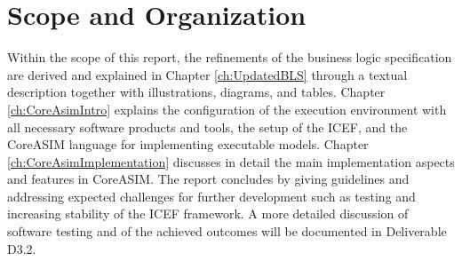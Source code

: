 \section{Scope and Organization}
Within the scope of this report, the refinements of the business logic specification are derived and explained in Chapter \ref{ch:UpdatedBLS} through a textual description together with illustrations, diagrams, and tables. Chapter \ref{ch:CoreAsimIntro} explains the configuration of the execution environment with all necessary software products and tools, the setup of the ICEF, and the CoreASIM language for implementing executable models. Chapter \ref{ch:CoreAsimImplementation} discusses in detail the main implementation aspects and features in CoreASIM. The report concludes by giving guidelines and addressing expected challenges for further development such as testing and increasing stability of the ICEF framework. A more detailed discussion of software testing and of the achieved outcomes will be documented in Deliverable D3.2.


\newpage

